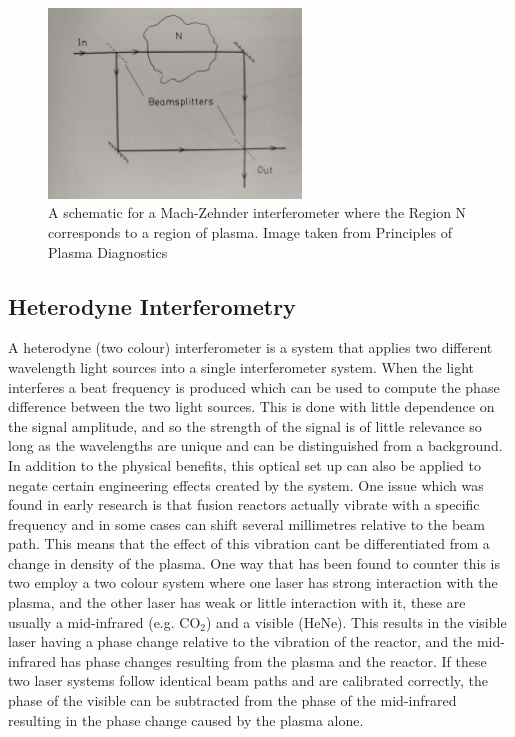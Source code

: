 \documentclass[12pt,a4paper,oneside]{report}
\begin{document}
\begin{figure}[H]
\includegraphics[width=0.6\textwidth, center,angle=0]{Images/mzint.jpg}
\caption{A schematic for a Mach-Zehnder interferometer where the Region N corresponds to a region of plasma. Image taken from Principles of Plasma Diagnostics \cite[p.~97]{Hutchinson2005PrinciplesDiagnostics}}
\label{mzint}
\end{figure}

	\subsection{Heterodyne Interferometry}
A heterodyne (two colour) interferometer is a system that applies two different wavelength light sources into a single interferometer system. When the light interferes a beat frequency is produced which can be used to compute the phase difference between the two light sources. This is done with little dependence on the signal amplitude, and so the strength of the signal is of little relevance so long as the wavelengths are unique and can be distinguished from a background. In addition to the physical benefits, this optical set up can also be applied to negate certain engineering effects created by the system. One issue which was found in early research is that fusion reactors actually vibrate with a specific frequency and in some cases can shift several millimetres relative to the beam path. This means that the effect of this vibration cant be differentiated from a change in density of the plasma. One way that has been found to counter this is two employ a two colour system where one laser has strong interaction with the plasma, and the other laser has weak or little interaction with it, these are usually a mid-infrared (e.g. CO$_{2}$) and a visible (HeNe). This results in the visible laser having a phase change relative to the vibration of the reactor, and the mid-infrared has phase changes resulting from the plasma and the reactor. If these two laser systems follow identical beam paths and are calibrated correctly, the phase of the visible can be subtracted from the phase of the mid-infrared resulting in the phase change caused by the plasma alone.\\
\end{document}
